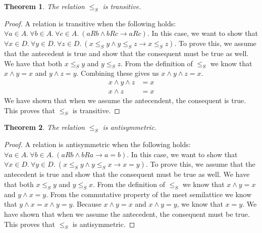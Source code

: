 \documentclass[10pt,letter]{article}
\newtheorem*{thm}{Theorem}
\begin{document}
\begin{thm} The relation $\le_S$ is transitive. \end{thm}
\begin{proof} A relation is transitive when the following holds: $\forall a \in A .\ \forall b \in A .\ \forall c \in A .\ (aRb \wedge bRc \rightarrow aRc)$. In this case, we want to show that $\forall x \in D .\ \forall y \in D .\ \forall z \in D .\ (x \le_S y \wedge y \le_S z \rightarrow x \le_S z)$. To prove this, we assume that the antecedent is true and show that the consequent must be true as well. We have that both $x \le_S y$ and $y \le_S z$. From the definition of $\le_S$ we know that $x \wedge y = x$ and $y \wedge z = y$. Combining these gives us $x \wedge y \wedge z = x$. 
\begin{align*}
x \wedge y \wedge z &= x \\
x \wedge z &= x
\end{align*}
We have shown that when we assume the antecendent, the consequent is true. This proves that $\le_S$ is transitive.
\end{proof}

\begin{thm} The relation $\le_S$ is antisymmetric. \end{thm}
\begin{proof} A relation is antisymmetric when the following holds: $\forall a \in A .\ \forall b \in A .\ (aRb \wedge bRa \rightarrow a = b)$. In this case, we want to show that $\forall x \in D .\ \forall y \in D .\ (x \le_S y \wedge y \le_S x \rightarrow x = y)$. To prove this, we assume that the antecedent is true and show that the consequent must be true as well. We have that both $x \le_S y$ and $y \le_S x$. From the definition of $\le_S$ we know that $x \wedge y = x$ and $y \wedge x = y$. From the commutative property of the meet semilattice we know that $y \wedge x = x \wedge y = y$. Because $x \wedge y = x$ and $x \wedge y = y$, we know that $x = y$. We have shown that when we assume the antecedent, the consequent must be true. This proves that $\le_S$ is antisymmetric.
\end{proof}
\end{document}
